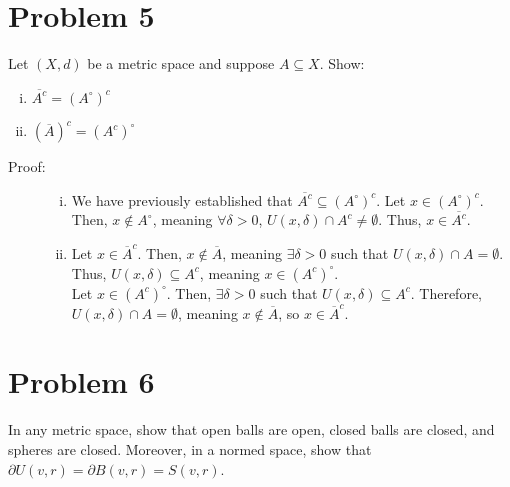 \documentclass[8pt]{extarticle}
\begin{document}
  \section{Problem 5}%
  Let $(X,d)$ be a metric space and suppose $A\subseteq X$. Show:
  \begin{enumerate}[(i)]
    \item $\overline{A^c} = (A^{\circ})^{c}$
    \item $(\overline{A})^{c} = (A^{c})^{\circ}$
  \end{enumerate}
  \begin{description}
    \item[Proof:]\hfill
      \begin{enumerate}[(i)]
        \item We have previously established that $\overline{A^{c}}\subseteq (A^{\circ})^c$. Let $x\in (A^{\circ})^{c}$. Then, $x\notin A^{\circ}$, meaning $\forall \delta > 0$, $U(x,\delta)\cap A^{c} \neq \emptyset$. Thus, $x\in \overline{A^{c}}$.
        \item Let $x\in \overline{A}^{c}$. Then, $x\notin \overline{A}$, meaning $\exists \delta > 0$ such that $U(x,\delta) \cap A = \emptyset$. Thus, $U(x,\delta)\subseteq A^{c}$, meaning $x\in (A^{c})^{\circ}$.\\

          Let $x\in (A^{c})^{\circ}$. Then, $\exists \delta > 0$ such that $U(x,\delta)\subseteq A^{c}$. Therefore, $U(x,\delta)\cap A = \emptyset$, meaning $x\notin \overline{A}$, so $x\in \overline{A}^{c}$.
      \end{enumerate}
  \end{description}
  \section{Problem 6}%
  In any metric space, show that open balls are open, closed balls are closed, and spheres are closed. Moreover, in a normed space, show that $\partial U(v,r) = \partial B(v,r) = S(v,r)$.
\end{document}
